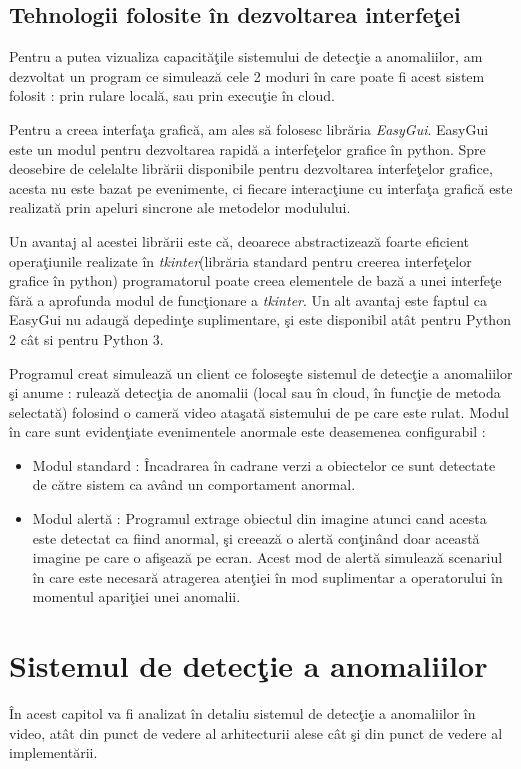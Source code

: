 \documentclass[a4paper,12pt]{report}
\begin{document}
\section {Tehnologii folosite în dezvoltarea interfeţei}
\quad Pentru a putea vizualiza capacităţile sistemului de detecţie a anomaliilor, am dezvoltat un program ce simulează cele 2 moduri în care poate fi acest sistem folosit : prin rulare locală, sau prin execuţie în cloud.
\par Pentru a creea interfaţa grafică, am ales să folosesc librăria \emph{EasyGui}. EasyGui este un modul pentru dezvoltarea rapidă a interfeţelor grafice în python. Spre deosebire de celelalte librării disponibile pentru dezvoltarea interfeţelor grafice, acesta nu este bazat pe evenimente, ci fiecare interacţiune cu interfaţa grafică este realizată prin apeluri sincrone ale metodelor modulului. 
\par Un avantaj al acestei librării este că, deoarece abstractizează foarte eficient operaţiunile realizate în \emph{tkinter}(librăria standard pentru creerea interfeţelor grafice în python) programatorul poate creea elementele de bază a unei interfeţe fără a aprofunda modul de funcţionare a \emph{tkinter}. Un alt avantaj este faptul ca EasyGui nu adaugă depedinţe suplimentare, şi este disponibil atât pentru Python 2 cât si pentru Python 3.
\par Programul creat simulează un client ce foloseşte sistemul de detecţie a anomaliilor şi anume : rulează detecţia de anomalii (local sau în cloud, în funcţie de metoda selectată) folosind o cameră video ataşată sistemului de pe care este rulat. Modul în care sunt evidenţiate evenimentele anormale este deasemenea configurabil :
\begin{itemize}
\item Modul standard : Încadrarea în cadrane verzi a obiectelor ce sunt detectate de către sistem ca având un comportament anormal. 
\item Modul alertă : Programul extrage obiectul din imagine atunci cand acesta este detectat ca fiind anormal, şi creează o alertă conţinând doar această imagine pe care o afişează pe ecran. Acest mod de alertă simulează scenariul în care este necesară atragerea atenţiei în mod suplimentar a operatorului în momentul apariţiei unei anomalii.  
\end{itemize}

\chapter{Sistemul de detecţie a anomaliilor}
\quad În acest capitol va fi analizat în detaliu sistemul de detecţie a anomaliilor în video, atât din punct de vedere al arhitecturii alese cât şi din punct de vedere al implementării.
\end{document}
